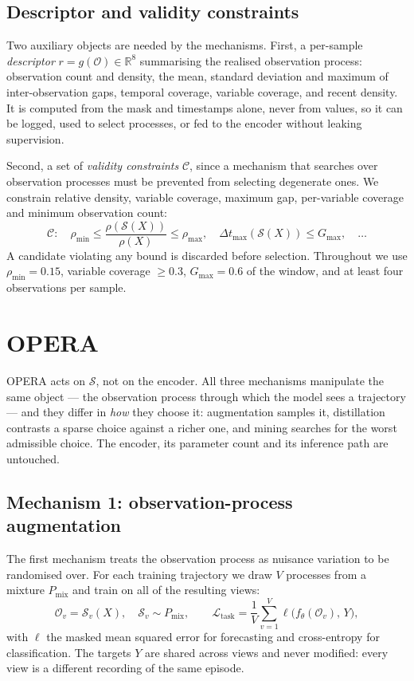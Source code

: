 \documentclass[sigconf,nonacm]{acmart}
\newcommand{\Sobs}{\mathcal{S}}
\newcommand{\Oobs}{\mathcal{O}}
\begin{document}
\subsection{Descriptor and validity constraints}
\label{sec:descriptor}
Two auxiliary objects are needed by the mechanisms. First, a per-sample \emph{descriptor}
$r=g(\Oobs)\in\mathbb{R}^{8}$ summarising the realised observation process: observation count and density, the
mean, standard deviation and maximum of inter-observation gaps, temporal coverage, variable coverage, and recent
density. It is computed from the mask and timestamps alone, never from values, so it can be logged, used to
select processes, or fed to the encoder without leaking supervision.

Second, a set of \emph{validity constraints} $\mathcal{C}$, since a mechanism that searches over observation
processes must be prevented from selecting degenerate ones. We constrain relative density, variable coverage,
maximum gap, per-variable coverage and minimum observation count:
\begin{equation}
\mathcal{C}:\quad \rho_{\min}\le\frac{\rho(\Sobs(X))}{\rho(X)}\le\rho_{\max},\quad
\Delta t_{\max}(\Sobs(X))\le G_{\max},\quad \dots
\label{eq:constraints}
\end{equation}
A candidate violating any bound is discarded before selection. Throughout we use $\rho_{\min}=0.15$, variable
coverage $\ge 0.3$, $G_{\max}=0.6$ of the window, and at least four observations per sample.

\section{OPERA}
\label{sec:method}
OPERA acts on $\Sobs$, not on the encoder. All three mechanisms manipulate the same object --- the observation
process through which the model sees a trajectory --- and they differ in \emph{how} they choose it:
augmentation samples it, distillation contrasts a sparse choice against a richer one, and mining searches for
the worst admissible choice. The encoder, its parameter count and its inference path are untouched.

\subsection{Mechanism 1: observation-process augmentation}
\label{sec:aug}
The first mechanism treats the observation process as nuisance variation to be randomised over. For each
training trajectory we draw $V$ processes from a mixture $P_{\mathrm{mix}}$ and train on all of the resulting
views:
\begin{equation}
\Oobs_v=\Sobs_v(X),\quad \Sobs_v\sim P_{\mathrm{mix}},\qquad
\mathcal{L}_{\mathrm{task}}=\frac1V\sum_{v=1}^{V}\ell\big(f_\theta(\Oobs_v),\,Y\big),
\label{eq:aug}
\end{equation}
with $\ell$ the masked mean squared error for forecasting and cross-entropy for classification. The targets $Y$
are shared across views and never modified: every view is a different recording of the same episode.
\end{document}
